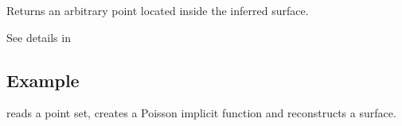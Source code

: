 {
Returns an arbitrary point located inside the inferred surface.
}

See details in \\


\subsection{Example}

 reads a point set, creates a Poisson implicit function and reconstructs a surface.



